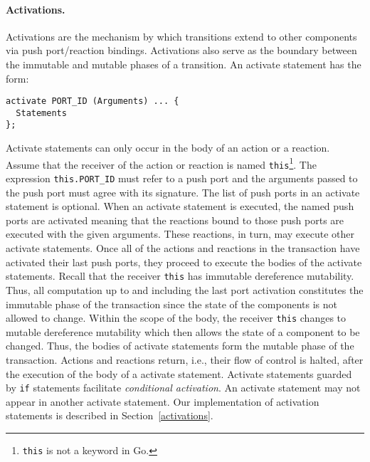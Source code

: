\paragraph{Activations.}
Activations are the mechanism by which transitions extend to other components via push port/reaction bindings.
Activations also serve as the boundary between the immutable and mutable phases of a transition.
An activate statement has the form:
\begin{verbatim}
activate PORT_ID (Arguments) ... {
  Statements
};
\end{verbatim}
Activate statements can only occur in the body of an action or a reaction.
Assume that the receiver of the action or reaction is named \verb+this+\footnote{\verb+this+ is not a keyword in Go.}.
The expression \verb+this.PORT_ID+ must refer to a push port and the arguments passed to the push port must agree with its signature.
The list of push ports in an activate statement is optional.
When an activate statement is executed, the named push ports are activated meaning that the reactions bound to those push ports are executed with the given arguments.
These reactions, in turn, may execute other activate statements.
Once all of the actions and reactions in the transaction have activated their last push ports, they proceed to execute the bodies of the activate statements.
Recall that the receiver \verb+this+ has immutable dereference mutability.
Thus, all computation up to and including the last port activation constitutes the immutable phase of the transaction since the state of the components is not allowed to change.
Within the scope of the body, the receiver \verb+this+ changes to mutable dereference mutability which then allows the state of a component to be changed.
Thus, the bodies of activate statements form the mutable phase of the transaction.
Actions and reactions return, i.e., their flow of control is halted, after the execution of the body of a activate statement.
Activate statements guarded by \verb+if+ statements facilitate \emph{conditional activation}.
An activate statement may not appear in another activate statement.
Our implementation of activation statements is described in Section~\ref{activations}.

